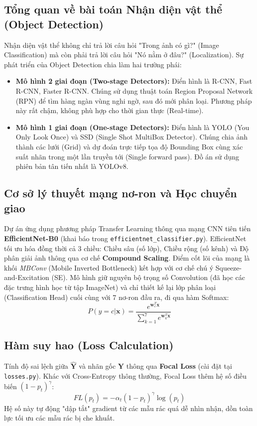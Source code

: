 \documentclass[12pt, a4paper]{article}
\begin{document}
\subsection{Tổng quan về bài toán Nhận diện vật thể (Object Detection)}
Nhận diện vật thể không chỉ trả lời câu hỏi "Trong ảnh có gì?" (Image Classification) mà còn phải trả lời câu hỏi "Nó nằm ở đâu?" (Localization). Sự phát triển của Object Detection chia làm hai trường phái:
\begin{itemize}
    \item \textbf{Mô hình 2 giai đoạn (Two-stage Detectors):} Điển hình là R-CNN, Fast R-CNN, Faster R-CNN. Chúng sử dụng thuật toán Region Proposal Network (RPN) để tìm hàng ngàn vùng nghi ngờ, sau đó mới phân loại. Phương pháp này rất chậm, không phù hợp cho thời gian thực (Real-time).
    \item \textbf{Mô hình 1 giai đoạn (One-stage Detectors):} Điển hình là YOLO (You Only Look Once) và SSD (Single Shot MultiBox Detector). Chúng chia ảnh thành các lưới (Grid) và dự đoán trực tiếp tọa độ Bounding Box cùng xác suất nhãn trong một lần truyền tới (Single forward pass). Đồ án sử dụng phiên bản tân tiến nhất là YOLOv8.
\end{itemize}

\subsection{Cơ sở lý thuyết mạng nơ-ron và Học chuyển giao}
Dự án ứng dụng phương pháp Transfer Learning thông qua mạng CNN tiên tiến \textbf{EfficientNet-B0} (khai báo trong \texttt{efficientnet\_classifier.py}). EfficientNet tối ưu hóa đồng thời cả 3 chiều: Chiều sâu (số lớp), Chiều rộng (số kênh) và Độ phân giải ảnh thông qua cơ chế \textbf{Compound Scaling}. Điểm cốt lõi của mạng là khối \textit{MBConv} (Mobile Inverted Bottleneck) kết hợp với cơ chế chú ý Squeeze-and-Excitation (SE). Mô hình giữ nguyên bộ trọng số Convolution (đã học các đặc trưng hình học từ tập ImageNet) và chỉ thiết kế lại lớp phân loại (Classification Head) cuối cùng với 7 nơ-ron đầu ra, đi qua hàm Softmax:
\begin{equation}
P(y = c|\mathbf{x}) = \frac{e^{\mathbf{w}_c^T \mathbf{x}}}{\sum_{k=1}^7 e^{\mathbf{w}_k^T \mathbf{x}}}
\end{equation}

\subsection{Hàm suy hao (Loss Calculation)}
Tính độ sai lệch giữa $\mathbf{\hat{Y}}$ và nhãn gốc $\mathbf{Y}$ thông qua \textbf{Focal Loss} (cài đặt tại \texttt{losses.py}). Khác với Cross-Entropy thông thường, Focal Loss thêm hệ số điều biến $(1 - p_t)^\gamma$:
\begin{equation}
FL(p_t) = -\alpha_t (1 - p_t)^\gamma \log(p_t)
\end{equation}
Hệ số này tự động "dập tắt" gradient từ các mẫu rác quá dễ nhìn nhận, dồn toàn lực tối ưu các mẫu rác bị che khuất. 
\end{document}
